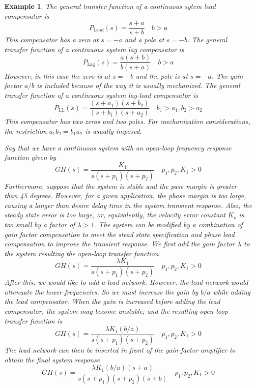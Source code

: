 \documentclass[11pt]{book}
\theoremstyle{example}
\newtheorem{example}{Example}[section]
\begin{document}
\begin{example}
	The general transfer function of a continuous sytem lead compensator is
	\begin{equation}
		P_\mathrm{Lead}(s)=\frac{s+a}{s+b}\quad{b>a}
	\end{equation}
	This compensator has a zero at $s=-a$ and a pole at $s=-b$. The general transfer function of a continuous system lag compensator is
	\begin{equation}
		P_\mathrm{Lag}(s)=\frac{a(s+b)}{b(s+a)}\quad{b>a}
	\end{equation}
	However, in this case the zero is at $s=-b$ and the pole is at $s=-a$. The gain factor $a/b$ is included because of the way it is usually mechanized. The general transfer function of a continuous system lag-lead compensator is
	\begin{equation}
		P_\mathrm{LL}(s)=\frac{(s+a_1)(s+b_2)}{(s+b_1)(s+a_2)}\quad{b_1>a_1,b_2>a_2}
	\end{equation}
	This compensator has two zeros and two poles. For mechanization considerations, the restriction $a_1b_2=b_1a_2$ is usually imposed.
	
	Say that we have a continuous system with an open-loop frequency response function given by
	\begin{equation}
		GH(s)=\frac{K_1}{s(s+p_1)(s+p_2)}\quad{p_1,p_2,K_1>0}
	\end{equation}
	Furthermore, suppose that the system is stable and the pase margin is greater than 45 degrees. However, for a given application, the phase margin is too large, causing a longer than desire delay time in the system transient response. Also, the steady state error is too large, or, equivalently, the velocity error constant $K_v$ is too small by a factor of $\lambda>1$. The system can be modified by a combination of gain factor compensation to meet the stead state specification and phase lead compensation to improve the transient response. We first add the gain factor $\lambda$ to the system resulting the open-loop transfer function
	\begin{equation}
		GH(s)=\frac{\lambda{K_1}}{s(s+p_1)(s+p_2)}\quad{p_1,p_2,K_1>0}
	\end{equation}
	After this, we would like to add a lead network. However, the lead network would attenuate the lower frequencies. So we must increase the gain by $b/a$ while adding the lead compensator. When the gain is increased before adding the lead compensator, the system may become unstable, and the resulting open-loop transfer function is
	\begin{equation}
		GH(s)=\frac{\lambda{K_1}(b/a)}{s(s+p_1)(s+p_2)}\quad{p_1,p_2,K_1>0}
	\end{equation}
	The lead network can then be inserted in front of the gain-factor amplifier to obtain the final system response
	\begin{equation}
		GH(s)=\frac{\lambda{K_1}(b/a)(s+a)}{s(s+p_1)(s+p_2)(s+b)}\quad{p_1,p_2,K_1>0}
	\end{equation}
	

\end{example}
\end{document}
